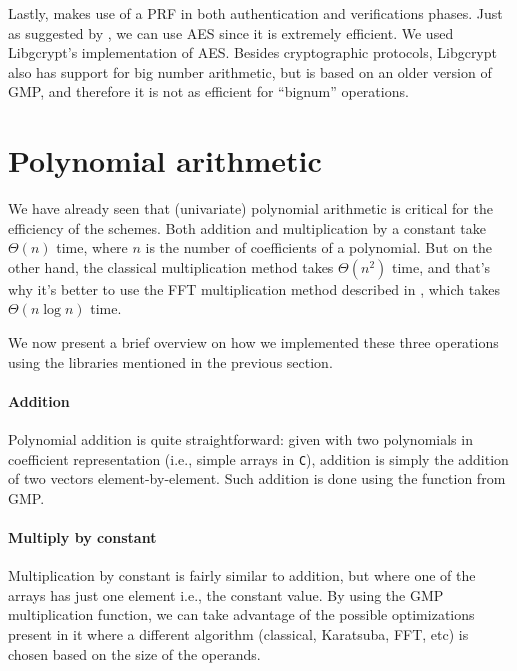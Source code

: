 Lastly,  makes use of a PRF in both
authentication and verifications phases. Just as suggested by
\citeauthor{catalano:fiore:2013}, we can use AES since it is extremely
efficient. We used Libgcrypt's \cite{libgcrypt} implementation of AES. Besides
cryptographic protocols, Libgcrypt also has support for big number arithmetic,
but is based on an older version of GMP, and therefore it is not as efficient
for ``bignum'' operations.

\section{Polynomial arithmetic}
We have already seen that (univariate) polynomial arithmetic is critical for
the efficiency of the  schemes.  Both addition
and multiplication by a constant take $\Theta(n)$ time, where $n$ is the number
of coefficients of a polynomial. But on the other hand, the classical
multiplication method takes $\Theta(n^2)$ time, and that's why it's better to
use the FFT multiplication method described in ,
which takes $\Theta(n \log{n})$ time.

We now present a brief overview on how we implemented these three operations
using the libraries mentioned in the previous section.

\paragraph*{Addition}
Polynomial addition is quite straightforward: given with two polynomials
in coefficient representation (i.e., simple arrays in \texttt{C}), addition is
simply the addition of two vectors element-by-element. Such addition is done
using the function from GMP.

%

\paragraph*{Multiply by constant}
Multiplication by constant is fairly similar to addition, but where one of the
arrays has just one element i.e., the constant value. By using the GMP
multiplication function, we can take advantage of the possible optimizations
present in it where a different algorithm (classical, Karatsuba, FFT, etc) is
chosen based on the size of the operands.

%

